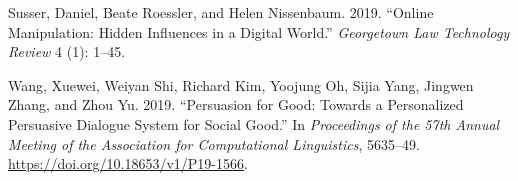 \documentclass[
  10pt,
]{article}
\newlength{\cslhangindent}
\newenvironment{CSLReferences}[2] %
 {\begin{list}{}{%
  \setlength{\itemindent}{0pt}
  \setlength{\leftmargin}{0pt}
  \setlength{\parsep}{0pt}
  \ifodd #1
   \setlength{\leftmargin}{\cslhangindent}
   \setlength{\itemindent}{-1\cslhangindent}
  \fi
  \setlength{\itemsep}{#2\baselineskip}}}
 {\end{list}}
\begin{document}
\begin{CSLReferences}{1}{0}
Susser, Daniel, Beate Roessler, and Helen Nissenbaum. 2019. {``Online
Manipulation: Hidden Influences in a Digital World.''} \emph{Georgetown
Law Technology Review} 4 (1): 1--45.

Wang, Xuewei, Weiyan Shi, Richard Kim, Yoojung Oh, Sijia Yang, Jingwen
Zhang, and Zhou Yu. 2019. {``Persuasion for Good: Towards a Personalized
Persuasive Dialogue System for Social Good.''} In \emph{Proceedings of
the 57th Annual Meeting of the Association for Computational
Linguistics}, 5635--49. \url{https://doi.org/10.18653/v1/P19-1566}.

\end{CSLReferences}
\end{document}

